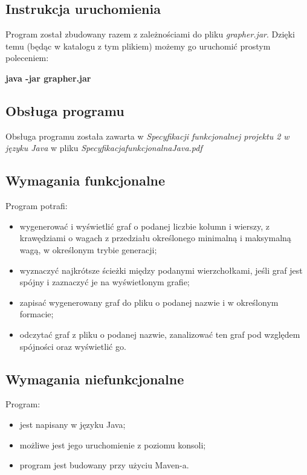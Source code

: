 \documentclass{article}
\begin{document}
\subsection{Instrukcja uruchomienia}
Program został zbudowany razem z zależnościami do pliku \emph{grapher.jar}. Dzięki temu (będąc
w katalogu z tym plikiem) możemy go uruchomić prostym poleceniem:

\medskip
\textbf{java -jar grapher.jar}

\subsection{Obsługa programu}
Obsługa programu została zawarta w \emph{Specyfikacji funkcjonalnej projektu 2 \linebreak w języku Java} w pliku \emph{Specyfikacja\textunderscore funkcjonalna\textunderscore Java.pdf}

\subsection{Wymagania funkcjonalne}
Program potrafi:
\begin{itemize}
    \item wygenerować i wyświetlić graf o podanej liczbie kolumn i wierszy, z krawędziami o wagach z przedziału określonego minimalną i maksymalną wagą, w określonym trybie generacji; 
    \item wyznaczyć najkrótsze ścieżki między podanymi wierzchołkami, jeśli graf jest spójny i zaznaczyć je na wyświetlonym grafie;
    \item zapisać wygenerowany graf do pliku o podanej nazwie i w określonym formacie;
    \item odczytać graf z pliku o podanej nazwie, zanalizować ten graf pod względem spójności oraz wyświetlić go. 
\end{itemize}

\subsection{Wymagania niefunkcjonalne}
Program:
\begin{itemize}
    \item jest napisany w języku Java;
    \item możliwe jest jego uruchomienie z poziomu konsoli;
    \item program jest budowany przy użyciu Maven-a.
\end{itemize}
\end{document}
